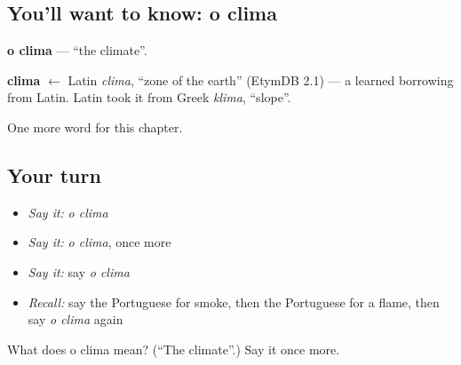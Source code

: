 \subsection*{You'll want to know: o clima}
\textbf{o clima} — \textquotedblleft{}the climate\textquotedblright{}.

\begin{cousinweb}
\textbf{clima} $\leftarrow$ Latin \emph{clima}, \textquotedblleft{}zone of the earth\textquotedblright{} (EtymDB 2.1) — a learned borrowing from Latin. Latin took it from Greek \emph{klima}, \textquotedblleft{}slope\textquotedblright{}.
\end{cousinweb}

\begin{grammarlens}[title={What you've built}]
One more word for this chapter.
\end{grammarlens}

\subsection*{Your turn}
\begin{itemize}
\raggedright
  \item \emph{Say it:} \emph{o clima}
  \item \emph{Say it:} \emph{o clima}, once more
  \item \emph{Say it:} say \emph{o clima}
  \item \emph{Recall:} say the Portuguese for smoke, then the Portuguese for a flame, then say \emph{o clima} again
\end{itemize}

\begin{tcolorbox}[breakable,colback=teal!4,colframe=teal!35!black,title={Before you move on}]
What does o clima mean? (\textquotedblleft{}The climate\textquotedblright{}.) Say it once more.
\end{tcolorbox}
